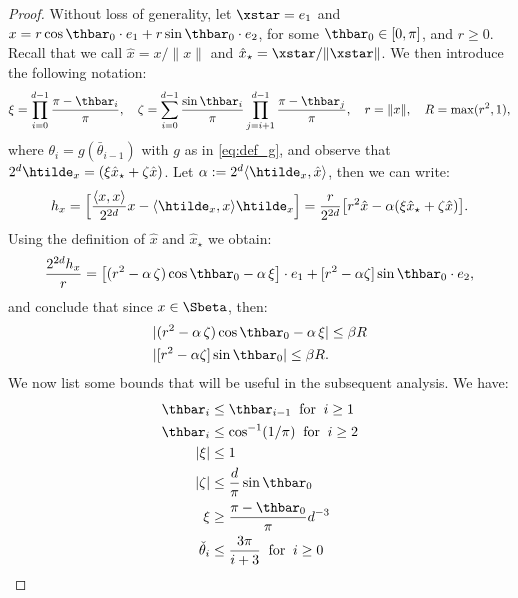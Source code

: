 \begin{proof}
	Without loss of generality, let $\xstar = e_1$ and $x = r \cos \thbar_0 \cdot e_1 + r \sin \thbar_0 \cdot e_2$, 
	for some $\thbar_0 \in [0,\pi]$,  and $r \geq 0$. Recall that we call $\hat{x} = x/\|x\|$ and $\hat{x}_\star = \xstar/\|\xstar\|$.
	We then introduce the following notation:
	\begin{equation}\label{eq:zeta_xi_def}
	\xi = \prod_{i=0}^{d-1} \frac{\pi - \thbar_i}{\pi}, \quad \zeta = \sum_{i=0}^{d-1} \frac{\sin \thbar_i}{\pi} \prod_{j=i+1}^{d-1} \frac{\pi - \thbar_j}{\pi}, \quad r = \|x\|,  \quad R = \max(r^2,1),
	\end{equation}
	where $\theta_i = g(\bar{\theta}_{i-1})$ with $g$ as in \eqref{eq:def_g}, and observe that $2^d \htilde_x =  (\xi \hat{x}_\star + \zeta \hat{x})$. 
	Let $\alpha := 2^{d} \langle \htilde_x, \hat{x} \rangle$, then we can write:
	\[
	\begin{aligned}
	h_x = \Big[ \frac{\langle x, x\rangle}{2^{2d}} x - \langle \htilde_x , x \rangle \htilde_x \Big] 
	= \frac{r}{2^{2d}} \big[ r^2 \hat{x} - \alpha (\xi \hat{x}_\star + \zeta \hat{x})\big].
	\end{aligned}
	\]
	Using the definition of $\hat{x}$ and $\hat{x}_\star$ we obtain:
	\[
	\frac{2^{2d} h_x}{r} = \big[ (r^2 - \alpha \, \zeta) \cos \thbar_0 - \alpha\, \xi \big] \cdot e_1 + [r^2 - \alpha \zeta] \sin \thbar_0 \cdot e_2,
	\]
	and conclude that since $x \in \Sbeta$, then:
	\begin{align}
	|(r^2 - \alpha \, \zeta) \cos \thbar_0 - \alpha\, \xi | &\leq \beta R  \label{eq:betaMcos}\\
	|[r^2 - \alpha \zeta] \sin \thbar_0| \leq \beta R. \label{eq:betaMsin}
	\end{align}
	We now list some bounds that will be useful in the subsequent analysis. We have:
	\begin{align}
	\thbar_i &\leq \thbar_{i-1} \;\;\text{for}\;\; i \geq 1  \label{eq:th_ilessth_i-1}\\
	\thbar_i &\leq \cos^{-1}(1/\pi) \;\;\text{for}\;\; i \geq 2  \label{eq:thibound}\\
	|\xi| &\leq 1 \label{eq:xibound}\\
	|\zeta| &\leq \frac{d}{\pi} \sin \thbar_0 \label{eq:zetabound}\\
	\xi &\geq \frac{\pi - \thbar_0}{\pi} d^{-3} \label{eq:xilwrbound}\\
	\check{\theta}_i &\leq \frac{3 \pi}{i + 3} \;\;\text{for}\;\; i \geq 0 \label{eq:checkthi1}\\

\end{align}
\end{proof}
